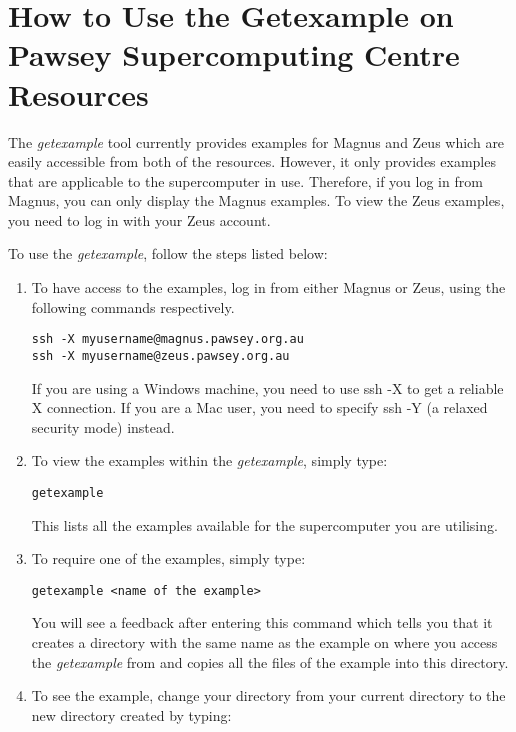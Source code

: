 \section{How to Use the Getexample on Pawsey Supercomputing Centre Resources}

The \emph{getexample} tool currently provides examples for Magnus and Zeus which are easily accessible from both of the resources. However, it only 
provides examples that are applicable to the supercomputer in use. Therefore, if you log in from Magnus, you can only display the Magnus examples. To 
view the Zeus examples, you need to log in with your Zeus account.

To use the \emph{getexample}, follow the steps listed below:

\begin{enumerate}
\item To have access to the examples, log in from either Magnus or Zeus, using the following commands respectively.
\begin{tcolorbox}
\begin{Verbatim}[fontsize=\small]
ssh -X myusername@magnus.pawsey.org.au
ssh -X myusername@zeus.pawsey.org.au
\end{Verbatim}
\end{tcolorbox}
If you are using a Windows machine, you need to use ssh -X to get a reliable X connection. If you are a Mac user, you need to specify ssh -Y (a relaxed
security mode) instead.
\item To view the examples within the \emph{getexample}, simply type:
\begin{tcolorbox}
\begin{Verbatim}[fontsize=\small]
getexample
\end{Verbatim}
\end{tcolorbox} 
This lists all the examples available for the supercomputer you are utilising.
\item To require one of the examples, simply type: 
\begin{tcolorbox}
\begin{Verbatim}[fontsize=\small]
getexample <name of the example>
\end{Verbatim}
\end{tcolorbox} 
You will see a feedback after entering this command which tells you that it creates a directory with the same name as the example on where you access the 
\emph{getexample} from and copies all the files of the example into this directory.
\item To see the example, change your directory from your current directory to the new directory created by typing: 

\end{enumerate}
